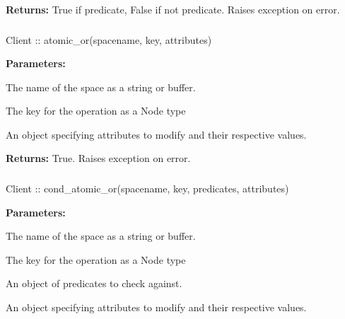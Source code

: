 \noindent\textbf{Returns:}
True if predicate, False if not predicate.  Raises exception on error.

\subsubsection{}
\label{api:nodejs:atomic_or}
\begin{javascriptcode}
Client :: atomic_or(spacename, key, attributes)
\end{javascriptcode}
\funcdesc 

\noindent\textbf{Parameters:}
\begin{description}[labelindent=\widthof{{\code{attributes}}},leftmargin=*,noitemsep,nolistsep,align=right]
\item[\code{spacename}] The name of the space as a string or buffer.
\item[\code{key}] The key for the operation as a Node type
\item[\code{attributes}] An object specifying attributes to modify and their respective values.
\end{description}

\noindent\textbf{Returns:}
True.  Raises exception on error.

\subsubsection{}
\label{api:nodejs:cond_atomic_or}
\begin{javascriptcode}
Client :: cond_atomic_or(spacename, key, predicates, attributes)
\end{javascriptcode}
\funcdesc 

\noindent\textbf{Parameters:}
\begin{description}[labelindent=\widthof{{\code{predicates}}},leftmargin=*,noitemsep,nolistsep,align=right]
\item[\code{spacename}] The name of the space as a string or buffer.
\item[\code{key}] The key for the operation as a Node type
\item[\code{predicates}] An object of predicates to check against.
\item[\code{attributes}] An object specifying attributes to modify and their respective values.
\end{description}


